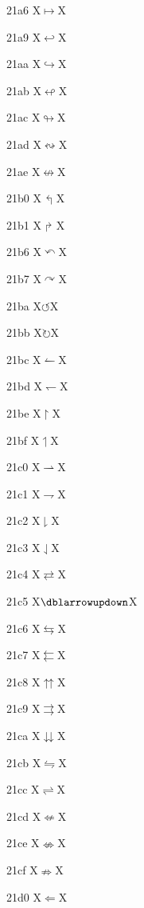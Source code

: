 \documentclass[11pt]{article}
\begin{document}
21a6 X{\ensuremath{\mapsto}}X

21a9 X{\ensuremath{\hookleftarrow}}X

21aa X{\ensuremath{\hookrightarrow}}X

21ab X{\ensuremath{\looparrowleft}}X

21ac X{\ensuremath{\looparrowright}}X

21ad X{\ensuremath{\leftrightsquigarrow}}X

21ae X{\ensuremath{\nleftrightarrow}}X

21b0 X{\ensuremath{\Lsh}}X

21b1 X{\ensuremath{\Rsh}}X

21b6 X{\ensuremath{\curvearrowleft}}X

21b7 X{\ensuremath{\curvearrowright}}X

21ba X{\ensuremath{\circlearrowleft}}X

21bb X{\ensuremath{\circlearrowright}}X

21bc X{\ensuremath{\leftharpoonup}}X

21bd X{\ensuremath{\leftharpoondown}}X

21be X{\ensuremath{\upharpoonright}}X

21bf X{\ensuremath{\upharpoonleft}}X

21c0 X{\ensuremath{\rightharpoonup}}X

21c1 X{\ensuremath{\rightharpoondown}}X

21c2 X{\ensuremath{\downharpoonright}}X

21c3 X{\ensuremath{\downharpoonleft}}X

21c4 X{\ensuremath{\rightleftarrows}}X

21c5 X{\ensuremath{\dblarrowupdown}}X

21c6 X{\ensuremath{\leftrightarrows}}X

21c7 X{\ensuremath{\leftleftarrows}}X

21c8 X{\ensuremath{\upuparrows}}X

21c9 X{\ensuremath{\rightrightarrows}}X

21ca X{\ensuremath{\downdownarrows}}X

21cb X{\ensuremath{\leftrightharpoons}}X

21cc X{\ensuremath{\rightleftharpoons}}X

21cd X{\ensuremath{\nLeftarrow}}X

21ce X{\ensuremath{\nLeftrightarrow}}X

21cf X{\ensuremath{\nRightarrow}}X

21d0 X{\ensuremath{\Leftarrow}}X
\end{document}
